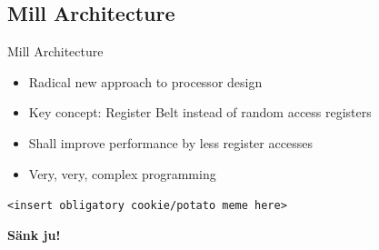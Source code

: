 \documentclass{beamer}
\begin{document}
\subsection{Mill Architecture}
\begin{frame}[t]{Mill Architecture}
\begin{itemize}
 \item<1,2,4-> Radical new approach to processor design
 \item<2,4-> Key concept: Register Belt instead of random access registers
 \item<2,4-> Shall improve performance by less register accesses
\end{itemize}
\begin{itemize}
 \item<4-> Very, very, complex programming
\end{itemize}

\end{frame}


\begin{frame}
  \begin{center}

   \texttt{<insert obligatory cookie/potato meme here>}

    \vspace{1cm}
    {\huge\bfseries Sänk ju!}
  \end{center}
\end{frame}
\end{document}
